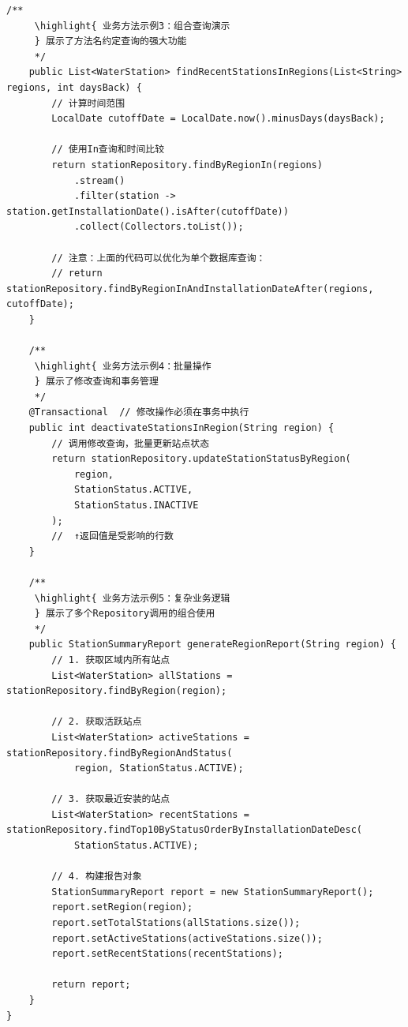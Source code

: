 \begin{lstlisting}[style=java]
    /**
     \highlight{ 业务方法示例3：组合查询演示
     } 展示了方法名约定查询的强大功能
     */
    public List<WaterStation> findRecentStationsInRegions(List<String> regions, int daysBack) {
        // 计算时间范围
        LocalDate cutoffDate = LocalDate.now().minusDays(daysBack);
        
        // 使用In查询和时间比较
        return stationRepository.findByRegionIn(regions)
            .stream()
            .filter(station -> station.getInstallationDate().isAfter(cutoffDate))
            .collect(Collectors.toList());
        
        // 注意：上面的代码可以优化为单个数据库查询：
        // return stationRepository.findByRegionInAndInstallationDateAfter(regions, cutoffDate);
    }
    
    /**
     \highlight{ 业务方法示例4：批量操作
     } 展示了修改查询和事务管理
     */
    @Transactional  // 修改操作必须在事务中执行
    public int deactivateStationsInRegion(String region) {
        // 调用修改查询，批量更新站点状态
        return stationRepository.updateStationStatusByRegion(
            region, 
            StationStatus.ACTIVE, 
            StationStatus.INACTIVE
        );
        //  ↑返回值是受影响的行数
    }
    
    /**
     \highlight{ 业务方法示例5：复杂业务逻辑
     } 展示了多个Repository调用的组合使用
     */
    public StationSummaryReport generateRegionReport(String region) {
        // 1. 获取区域内所有站点
        List<WaterStation> allStations = stationRepository.findByRegion(region);
        
        // 2. 获取活跃站点
        List<WaterStation> activeStations = stationRepository.findByRegionAndStatus(
            region, StationStatus.ACTIVE);
        
        // 3. 获取最近安装的站点
        List<WaterStation> recentStations = stationRepository.findTop10ByStatusOrderByInstallationDateDesc(
            StationStatus.ACTIVE);
        
        // 4. 构建报告对象
        StationSummaryReport report = new StationSummaryReport();
        report.setRegion(region);
        report.setTotalStations(allStations.size());
        report.setActiveStations(activeStations.size());
        report.setRecentStations(recentStations);
        
        return report;
    }
}


\end{lstlisting}
